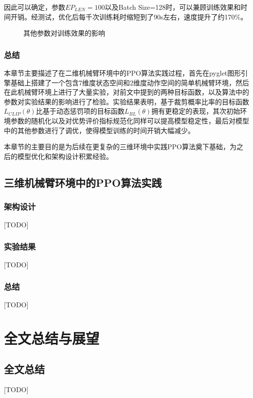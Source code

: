 \documentclass[bachelor]{thesis-uestc}
\begin{document}
	因此可以确定，参数$EP_{LEN}=100$以及Batch Size=128时，可以兼顾训练效果和时间开销。经测试，优化后每千次训练耗时缩短到了90s左右，速度提升了约170\%。

	\begin{figure}[h]
		\centering
		\caption{其他参数对训练效果的影响}
		\label{other-hyperparams}
	\end{figure}
	\subsection{总结}
	本章节主要描述了在二维机械臂环境中的PPO算法实践过程，首先在pyglet图形引擎基础上搭建了一个包含7维度状态空间和2维度动作空间的简单机械臂环境，然后在此机械臂环境上进行了大量实验，对前文中提到的两种目标函数，以及算法中的参数对实验结果的影响进行了检验。实验结果表明，基于裁剪概率比率的目标函数$L_{CLIP}(\theta)$比基于动态惩罚项的目标函数$L_{BL}(\theta)$拥有更稳定的表现，其次初始环境参数的随机化以及对优势评价指标规范化同样可以提高模型稳定性，最后对模型中的其他参数进行了调优，使得模型训练的时间开销大幅减少。
	
	本章节的主要目的是为后续在更复杂的三维环境中实践PPO算法奠下基础，为之后的模型优化和架构设计积累经验。
	
	\section{三维机械臂环境中的PPO算法实践}
	\subsection{架构设计}
	[TODO]
	\subsection{实验结果}
	[TODO]
	\subsection{总结}
	[TODO]
	
	\chapter{全文总结与展望}
	\section{全文总结}
	[TODO]
	
\end{document}
